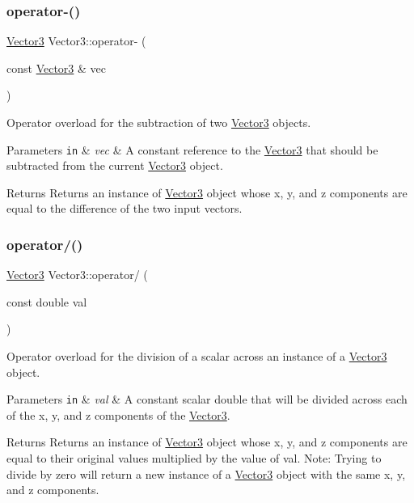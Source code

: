 \subsubsection{\texorpdfstring{operator-\/()}{operator-()}}
{\footnotesize\ttfamily \hyperlink{classVector3}{Vector3} Vector3\+::operator-\/ (\begin{DoxyParamCaption}\item[{const \hyperlink{classVector3}{Vector3} \&}]{vec }\end{DoxyParamCaption})}



Operator overload for the subtraction of two \hyperlink{classVector3}{Vector3} objects. 


\begin{DoxyParams}[1]{Parameters}
\mbox{\tt in}  & {\em vec} & A constant reference to the \hyperlink{classVector3}{Vector3} that should be subtracted from the current \hyperlink{classVector3}{Vector3} object.\\
\hline
\end{DoxyParams}
\begin{DoxyReturn}{Returns}
Returns an instance of \hyperlink{classVector3}{Vector3} object whose x, y, and z components are equal to the difference of the two input vectors. 
\end{DoxyReturn}
\mbox{\label{classVector3_af3ab78e4a06b41bd2b3f455301697a13}} 
\subsubsection{\texorpdfstring{operator/()}{operator/()}}
{\footnotesize\ttfamily \hyperlink{classVector3}{Vector3} Vector3\+::operator/ (\begin{DoxyParamCaption}\item[{const double}]{val }\end{DoxyParamCaption})}



Operator overload for the division of a scalar across an instance of a \hyperlink{classVector3}{Vector3} object. 


\begin{DoxyParams}[1]{Parameters}
\mbox{\tt in}  & {\em val} & A constant scalar double that will be divided across each of the x, y, and z components of the \hyperlink{classVector3}{Vector3}.\\
\hline
\end{DoxyParams}
\begin{DoxyReturn}{Returns}
Returns an instance of \hyperlink{classVector3}{Vector3} object whose x, y, and z components are equal to their original values multiplied by the value of val. Note\+: Trying to divide by zero will return a new instance of a \hyperlink{classVector3}{Vector3} object with the same x, y, and z components. 
\end{DoxyReturn}
\mbox{\label{classVector3_a11008100f53bc216fa17e3f80fd8e26e}} 
